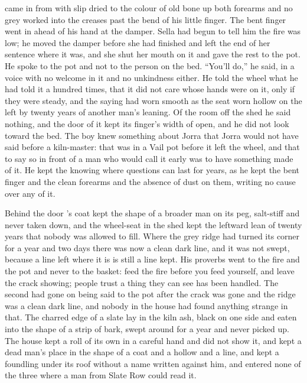 came in from  with slip dried to the colour of old bone up both forearms and no grey worked into the creases past the bend of his little finger. The bent finger went in ahead of his hand at the damper. Sella had begun to tell him the fire was low; he moved the damper before she had finished and left the end of her sentence where it was, and she shut her mouth on it and gave the rest to the pot. He spoke to the pot and not to the person on the bed. “You'll do,” he said, in a voice with no welcome in it and no unkindness either. He told the wheel what he had told it a hundred times, that it did not care whose hands were on it, only if they were steady, and the saying had worn smooth as the seat worn hollow on the left by twenty years of another man's leaning. Of the room off the shed he said nothing, and the door of it kept its finger's width of open, and he did not look toward the bed. The boy knew something about Jorra that Jorra would not have said before a kiln-master: that  was in a Vail pot before it left the wheel, and that to say so in front of a man who would call it early was to have something made of it. He kept the knowing where questions can last for years, as he kept the bent finger and the clean forearms and the absence of dust on them, writing no cause over any of it.

Behind the door 's coat kept the shape of a broader man on its peg, salt-stiff and never taken down, and the wheel-seat in the shed kept the leftward lean of twenty years that nobody was allowed to fill. Where the grey ridge had turned its corner for a year and two days there was now a clean dark line, and it was not swept, because a line left where it is is still a line kept. His proverbs went to the fire and the pot and never to the basket: feed the fire before you feed yourself, and leave the crack showing; people trust a thing they can see has been handled. The second had gone on being said to the pot after the crack was gone and the ridge was a clean dark line, and nobody in the house had found anything strange in that. The charred edge of a slate lay in the kiln ash, black on one side and eaten into the shape of a strip of bark, swept around for a year and never picked up. The house kept a roll of its own in a careful hand and did not show it, and kept a dead man's place in the shape of a coat and a hollow and a line, and kept a foundling under its roof without a name written against him, and entered none of the three where a man from Slate Row could read it.

